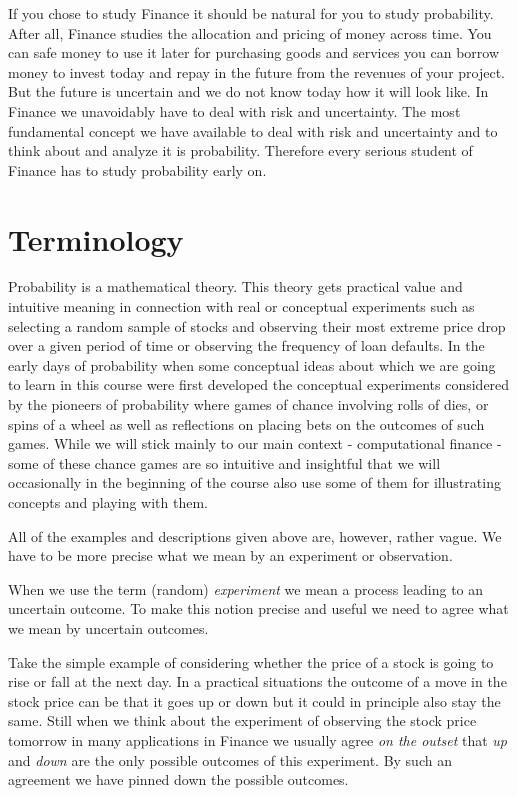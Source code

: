 \documentclass[
]{book}
\begin{document}
If you chose to study Finance it should be natural for you to study probability.
After all, Finance studies the allocation and pricing of money across time. You can
safe money to use it later for purchasing goods and services you can borrow money to
invest today and repay in the future from the revenues of your project. But the
future is uncertain and we do not know today how it will look like. In Finance we unavoidably
have to deal with risk and uncertainty. The most fundamental concept we have available
to deal with risk and uncertainty and to think about and analyze it is probability. Therefore
every serious student of Finance has to study probability early on.

\hypertarget{terminology}{%
\section{Terminology}\label{terminology}}

Probability is a mathematical theory. This theory gets practical value and intuitive meaning
in connection with real or conceptual experiments such as
selecting a random sample of stocks and observing their most extreme price drop over a
given period of time or observing the frequency of loan defaults. In the early days of
probability when some conceptual ideas about which we are going to learn in this course
were first developed the conceptual experiments considered by the pioneers of
probability where games of chance involving rolls of dies, or spins of a wheel as well
as reflections on placing bets on the outcomes of such games. While we will stick
mainly to our main context - computational finance - some of these chance games are
so intuitive and insightful that we will occasionally in the beginning of the course
also use some of them for illustrating concepts and playing with them.

All of the examples and
descriptions given above are, however, rather vague.
We have to be more precise what we mean by an
experiment or observation.

When we use the term (random) \emph{experiment} we mean a process leading to an uncertain
outcome. To make this notion precise and useful we need to agree what we mean by
uncertain outcomes.

Take the simple example of considering whether the price of a stock is
going to rise or fall at the next day. In a practical situations the outcome
of a move in the stock price can be that it goes up or down but it could in principle
also stay the same. Still when we think about the
experiment of observing the stock price tomorrow
in many applications in Finance we usually agree \emph{on the outset} that
\emph{up} and \emph{down} are the only possible outcomes of this experiment. By such an
agreement we have pinned down the possible outcomes.
\end{document}
